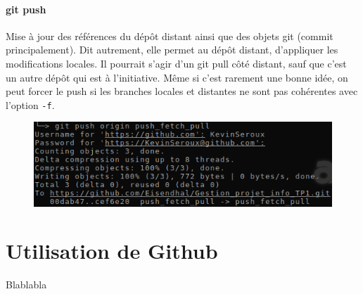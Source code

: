 \documentclass[11pt,canadien]{article}
\begin{document}
\paragraph{git push}Mise à jour des références du dépôt distant ainsi que des objets git (commit principalement). Dit autrement, elle permet au dépôt distant, d'appliquer les modifications locales. Il pourrait s'agir d'un git pull côté distant, sauf que c'est un autre dépôt qui est à l'initiative. Même si c'est rarement une bonne idée, on peut forcer le push si les branches locales et distantes ne sont pas cohérentes avec l'option \texttt{-f}.
\begin{figure}[h]
	\centering
	\includegraphics{images/git_push.png}
\end{figure}


\newpage
\section{Utilisation de Github}
Blablabla
\end{document}
